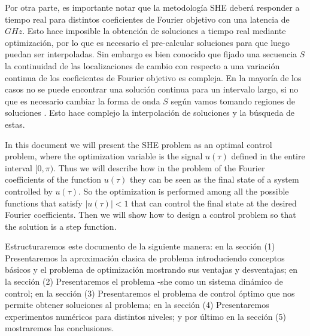 %
Por otra parte, es importante notar que la metodología SHE deberá responder a tiempo real para distintos coeficientes de Fourier objetivo con una latencia de $GHz$. 
%
Esto hace imposible la obtención de soluciones a tiempo real mediante optimización, por lo que es necesario el pre-calcular soluciones para que luego puedan ser interpoladas.
%
Sin embargo es bien conocido que fijado una secuencia $S$ la continuidad de las localizaciones de cambio con respecto a una variación continua de los coeficientes de Fourier objetivo es compleja. 
%
En la mayoría de los casos no se puede encontrar una solución continua para un intervalo largo, si no que es necesario cambiar la forma de onda $S$ según vamos tomando regiones de soluciones \cite{Yang2015,Yang2017}. 
% 
Esto hace complejo la interpolación de soluciones y la búsqueda de estas.
\newline

%
In this document we will present the SHE problem as an optimal control problem, where the optimization variable is the signal $ u (\tau) $ defined in the entire interval $ [0,\pi) $.
%
Thus we will describe how in the problem of the Fourier coefficients of the function $ u (\tau) $ they can be seen as the final state of a system controlled by $ u (\tau) $.
%
So the optimization is performed among all the possible functions that satisfy $ | u (\tau) | <1 $ that can control the final state at the desired Fourier coefficients.
%
Then we will show how to design a control problem so that the solution is a step function.
%
\newline

Estructuraremos este documento de la siguiente manera: en la sección (1) Presentaremos la aproximación clasica de problema introduciendo conceptos básicos y el problema de optimización mostrando sus ventajas y desventajas; en la sección (2) Presentaremos el problema -she como un sistema dinámico de control; en la sección (3) Presentaremos el problema de control óptimo que nos permite obtener soluciones al problema; en la sección (4) Presentaremos experimentos numéricos para distintos niveles; y por último en la sección (5) mostraremos las conclusiones. 
